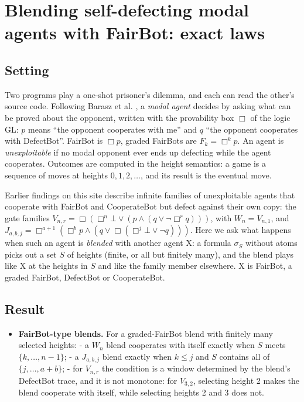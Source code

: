 \documentclass{article}
\begin{document}
\section{Blending self-defecting modal agents with FairBot: exact laws}
\label{sec:blend-window-laws}

\subsection*{Setting}

Two programs play a one-shot prisoner's dilemma, and each can read the other's source code.
Following Barasz et al. \cite{barasz2014robust}, a \emph{modal agent} decides by asking what can be proved
about the opponent, written with the provability box $\Box$ of the logic GL: $p$ means ``the
opponent cooperates with me'' and $q$ ``the opponent cooperates with DefectBot''. FairBot is
$\Box p$, graded FairBots are $F_k = \Box^k p$. An agent is \emph{unexploitable} if no modal opponent
ever ends up defecting while the agent cooperates. Outcomes are computed in the height semantics:
a game is a sequence of moves at heights $0, 1, 2, \dots$, and its result is the eventual move.

Earlier findings on this site describe infinite families of unexploitable agents that cooperate
with FairBot and CooperateBot but defect against their own copy: the gate families
$V_{n,r} = \Box(\Box^n\bot \vee (p \wedge (q \vee \neg\Box^r q)))$, with $W_n = V_{n,1}$, and
$J_{a,b,j} = \Box^{a+1}(\Box^b p \wedge (q \vee \Box(\Box^j\bot \vee \neg q)))$. Here we ask what
happens when such an agent is \emph{blended} with another agent X: a formula $\sigma_S$ without atoms
picks out a set $S$ of heights (finite, or all but finitely many), and the blend plays like X at
the heights in $S$ and like the family member elsewhere. X is FairBot, a graded FairBot,
DefectBot or CooperateBot.

\subsection*{Result}

\begin{itemize}
\item \textbf{FairBot-type blends.} For a graded-FairBot blend with finitely many selected heights: - a $W_n$ blend cooperates with itself exactly when $S$ meets $\{k, \dots, n-1\}$; - a $J_{a,b,j}$ blend exactly when $k \le j$ and $S$ contains all of $\{j, \dots, a+b\}$; - for $V_{n,r}$ the condition is a window determined by the blend's DefectBot trace, and it is not monotone: for $V_{3,2}$, selecting height 2 makes the blend cooperate with itself, while selecting heights 2 and 3 does not.
\end{itemize}
\end{document}
